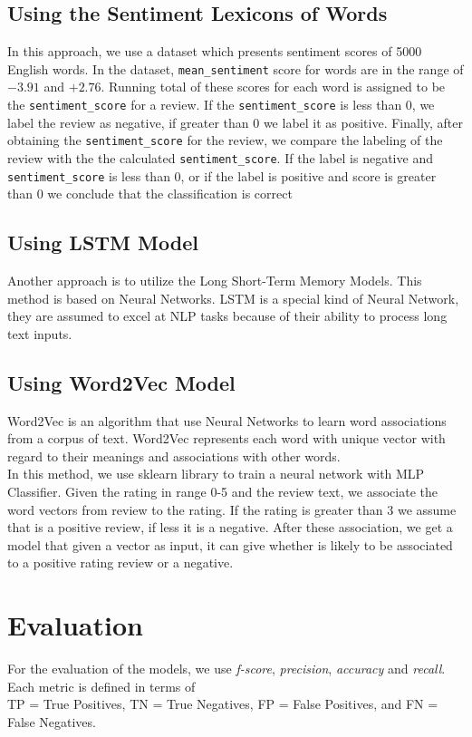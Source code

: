 \documentclass[11pt,a4paper]{article}
\begin{document}
\subsection{Using the Sentiment Lexicons of Words}
	In this approach, we use a dataset which presents sentiment scores of 5000 English words. In the dataset, \texttt{mean\_sentiment} score for words are in the range of $-3.91$ and $+2.76$. Running total of these scores for each word is assigned to be the \texttt{sentiment\_score} for a review. If the \texttt{sentiment\_score} is less than 0, we label the review as negative, if greater than 0 we label it as positive. Finally, after obtaining the \texttt{sentiment\_score} for the review, we compare the labeling of the review with the the calculated \texttt{sentiment\_score}. If the label is negative and \texttt{sentiment\_score} is less than 0, or if the label is positive and score is greater than 0 we conclude that the classification is correct 
\subsection{Using LSTM Model}
	Another approach is to utilize the Long Short-Term Memory Models. 	This method is based on Neural Networks. LSTM is a special kind of Neural Network, they are assumed to excel at NLP tasks because of their ability to process long text inputs.  

\subsection{Using Word2Vec Model}
Word2Vec is an algorithm that use Neural Networks to learn word associations from a corpus of text. Word2Vec represents each word with unique vector with regard to their meanings and associations with other words. \\
In this method, we use sklearn library to train a neural network with MLP Classifier. Given the rating in range 0-5 and the review text, we associate the word vectors from review to the rating. If the rating is greater than 3 we assume that is a positive review, if less it is a negative. After these association, we get a model that given a vector as input, it can give whether is likely to be associated to a positive rating review or a negative. 

\section{Evaluation}
For the evaluation of the models, we use \textit{f-score}, \textit{precision}, \textit{accuracy} and \textit{recall}. Each metric is defined in terms of \\TP = True Positives, TN = True Negatives, FP = False Positives, and FN = False Negatives.
\end{document}
